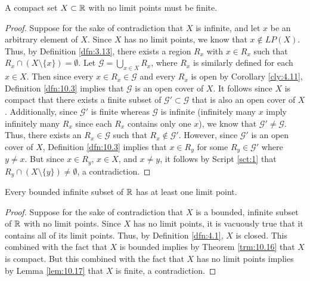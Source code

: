 \documentclass[../main.tex]{subfiles}
\begin{document}
\begin{lemma}\label{lem:10.17}
    A compact set $X\subset\mathbb{R}$ with no limit points must be finite.
    \begin{proof}
        Suppose for the sake of contradiction that $X$ is infinite, and let $x$ be an arbitrary element of $X$. Since $X$ has no limit points, we know that $x\notin LP(X)$. Thus, by Definition \ref{dfn:3.13}, there exists a region $R_x$ with $x\in R_x$ such that $R_x\cap(X\setminus\{x\})=\emptyset$. Let $\mathcal{G}=\bigcup_{x\in X}R_x$, where $R_x$ is similarly defined for each $x\in X$. Then since every $x\in R_x\in\mathcal{G}$ and every $R_x$ is open by Corollary \ref{cly:4.11}, Definition \ref{dfn:10.3} implies that $\mathcal{G}$ is an open cover of $X$. It follows since $X$ is compact that there exists a finite subset of $\mathcal{G}'\subset\mathcal{G}$ that is also an open cover of $X$. Additionally, since $\mathcal{G}'$ is finite whereas $\mathcal{G}$ is infinite (infinitely many $x$ imply infinitely many $R_x$ since each $R_x$ contains only one $x$), we know that $\mathcal{G}'\neq\mathcal{G}$. Thus, there exists an $R_x\in\mathcal{G}$ such that $R_x\notin\mathcal{G}'$. However, since $\mathcal{G}'$ is an open cover of $X$, Definition \ref{dfn:10.3} implies that $x\in R_y$ for some $R_y\in\mathcal{G}'$ where $y\neq x$. But since $x\in R_y$, $x\in X$, and $x\neq y$, it follows by Script \ref{sct:1} that $R_y\cap(X\setminus\{y\})\neq\emptyset$, a contradiction.
    \end{proof}
\end{lemma}

\begin{theorem}\label{trm:10.18}
    Every bounded infinite subset of $\mathbb{R}$ has at least one limit point.
    \begin{proof}
        Suppose for the sake of contradiction that $X$ is a bounded, infinite subset of $\mathbb{R}$ with no limit points. Since $X$ has no limit points, it is vacuously true that it contains all of its limit points. Thus, by Definition \ref{dfn:4.1}, $X$ is closed. This combined with the fact that $X$ is bounded implies by Theorem \ref{trm:10.16} that $X$ is compact. But this combined with the fact that $X$ has no limit points implies by Lemma \ref{lem:10.17} that $X$ is finite, a contradiction.
    \end{proof}
\end{theorem}
\end{document}
